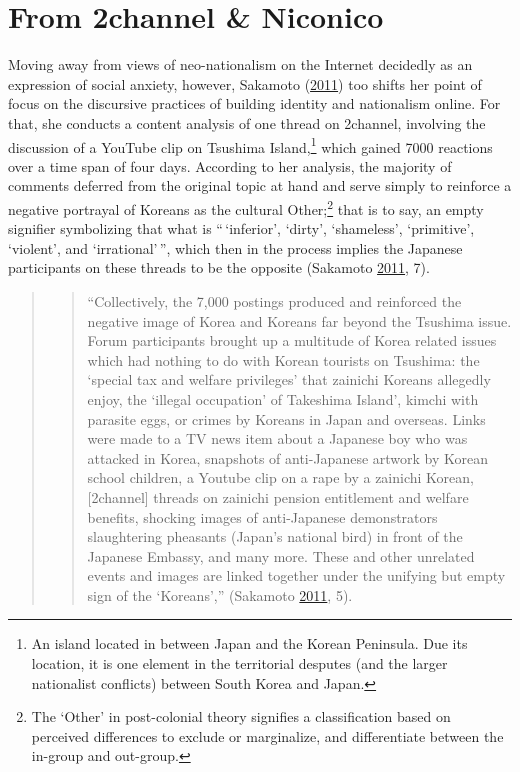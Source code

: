 \documentclass[10pt,british,A4paper,oneside]{memoir}
\begin{document}
\section{From 2channel \& Niconico}\label{from-2channel-niconico}

Moving away from views of neo-nationalism on the Internet decidedly as
an expression of social anxiety, however, Sakamoto
(\protect\hyperlink{ref-sakamoto_koreans_2011}{2011}) too shifts her
point of focus on the discursive practices of building identity and
nationalism online. For that, she conducts a content analysis of one
thread on 2channel, involving the discussion of a YouTube clip on
Tsushima Island,\footnote{An island located in between Japan and the
  Korean Peninsula. Due its location, it is one element in the
  territorial desputes (and the larger nationalist conflicts) between
  South Korea and Japan.} which gained 7000 reactions over a time span
of four days. According to her analysis, the majority of comments
deferred from the original topic at hand and serve simply to reinforce a
negative portrayal of Koreans as the cultural Other;\footnote{The
  `Other' in post-colonial theory signifies a classification based on
  perceived differences to exclude or marginalize, and differentiate
  between the in-group and out-group.} that is to say, an empty
signifier symbolizing that what is ``\,`inferior', `dirty', `shameless',
`primitive', `violent', and `irrational'\,'', which then in the process
implies the Japanese participants on these threads to be the opposite
(Sakamoto \protect\hyperlink{ref-sakamoto_koreans_2011}{2011}, 7).

\begin{quote}
\begin{quote}
``Collectively, the 7,000 postings produced and reinforced the negative
image of Korea and Koreans far beyond the Tsushima issue. Forum
participants brought up a multitude of Korea related issues which had
nothing to do with Korean tourists on Tsushima: the `special tax and
welfare privileges' that zainichi Koreans allegedly enjoy, the `illegal
occupation' of Takeshima Island', kimchi with parasite eggs, or crimes
by Koreans in Japan and overseas. Links were made to a TV news item
about a Japanese boy who was attacked in Korea, snapshots of
anti-Japanese artwork by Korean school children, a Youtube clip on a
rape by a zainichi Korean, {[}2channel{]} threads on zainichi pension
entitlement and welfare benefits, shocking images of anti-Japanese
demonstrators slaughtering pheasants (Japan's national bird) in front of
the Japanese Embassy, and many more. These and other unrelated events
and images are linked together under the unifying but empty sign of the
`Koreans','' (Sakamoto
\protect\hyperlink{ref-sakamoto_koreans_2011}{2011}, 5).
\end{quote}
\end{quote}
\end{document}
